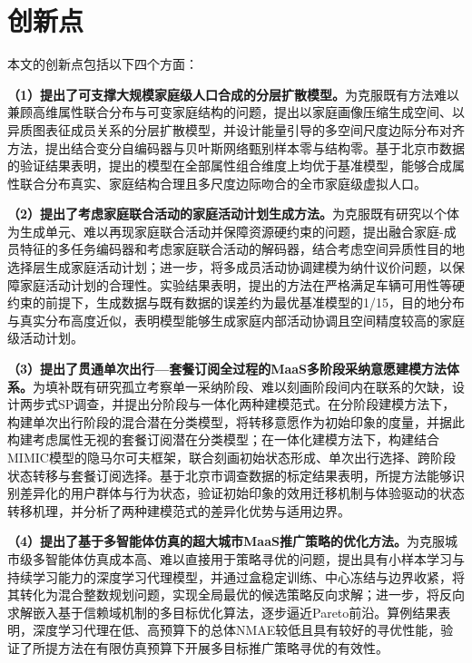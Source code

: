 \section{创新点}\label{sec.conclusion.innovation}


本文的创新点包括以下四个方面：

\textbf{（1）提出了可支撑大规模家庭级人口合成的分层扩散模型。}为克服既有方法难以兼顾高维属性联合分布与可变家庭结构的问题，提出以家庭画像压缩生成空间、以异质图表征成员关系的分层扩散模型，并设计能量引导的多空间尺度边际分布对齐方法，提出结合变分自编码器与贝叶斯网络甄别样本零与结构零。基于北京市数据的验证结果表明，提出的模型在全部属性组合维度上均优于基准模型，能够合成属性联合分布真实、家庭结构合理且多尺度边际吻合的全市家庭级虚拟人口。

\textbf{（2）提出了考虑家庭联合活动的家庭活动计划生成方法。}为克服既有研究以个体为生成单元、难以再现家庭联合活动并保障资源硬约束的问题，提出融合家庭-成员特征的多任务编码器和考虑家庭联合活动的解码器，结合考虑空间异质性目的地选择层生成家庭活动计划；进一步，将多成员活动协调建模为纳什议价问题，以保障家庭活动计划的合理性。实验结果表明，提出的方法在严格满足车辆可用性等硬约束的前提下，生成数据与既有数据的误差约为最优基准模型的1/15，目的地分布与真实分布高度近似，表明模型能够生成家庭内部活动协调且空间精度较高的家庭级活动计划。

\textbf{（3）提出了贯通单次出行—套餐订阅全过程的MaaS多阶段采纳意愿建模方法体系。}为填补既有研究孤立考察单一采纳阶段、难以刻画阶段间内在联系的欠缺，设计两步式SP调查，并提出分阶段与一体化两种建模范式。在分阶段建模方法下，构建单次出行阶段的混合潜在分类模型，将转移意愿作为初始印象的度量，并据此构建考虑属性无视的套餐订阅潜在分类模型；在一体化建模方法下，构建结合MIMIC模型的隐马尔可夫框架，联合刻画初始状态形成、单次出行选择、跨阶段状态转移与套餐订阅选择。基于北京市调查数据的标定结果表明，所提方法能够识别差异化的用户群体与行为状态，验证初始印象的效用迁移机制与体验驱动的状态转移机理，并分析了两种建模范式的差异化优势与适用边界。

\textbf{（4）提出了基于多智能体仿真的超大城市MaaS推广策略的优化方法。}为克服城市级多智能体仿真成本高、难以直接用于策略寻优的问题，提出具有小样本学习与持续学习能力的深度学习代理模型，并通过盒稳定训练、中心冻结与边界收紧，将其转化为混合整数规划问题，实现全局最优的候选策略反向求解；进一步，将反向求解嵌入基于信赖域机制的多目标优化算法，逐步逼近Pareto前沿。算例结果表明，深度学习代理在低、高预算下的总体NMAE较低且具有较好的寻优性能，验证了所提方法在有限仿真预算下开展多目标推广策略寻优的有效性。

